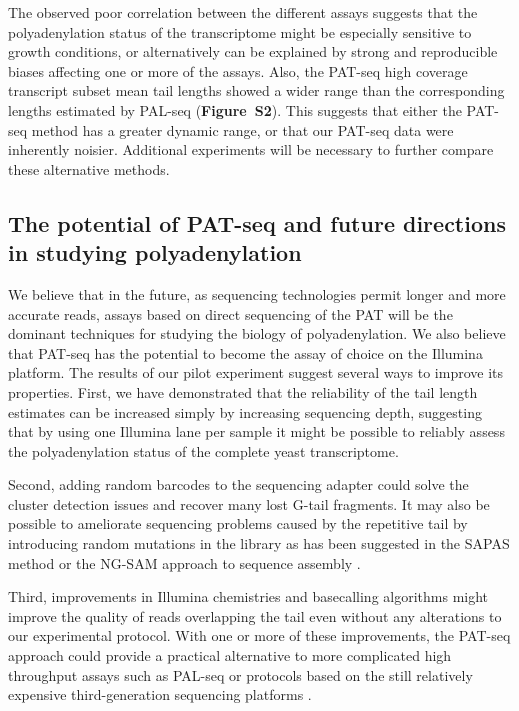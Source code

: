 \documentclass[10pt]{article}
\begin{document}
The observed poor correlation between the different assays suggests that the polyadenylation status of the transcriptome might be especially sensitive to growth conditions, or alternatively can be explained by strong and reproducible biases affecting one or more of the assays. Also, the PAT-seq high coverage transcript subset mean tail lengths showed a wider range than the corresponding lengths estimated by PAL-seq (\textbf{Figure~S2}).  This suggests that either the PAT-seq method has a greater dynamic range, or that our PAT-seq data were inherently noisier. Additional experiments will be necessary to further compare these alternative methods.

\subsection*{The potential of PAT-seq and future directions in studying polyadenylation}

We believe that in the future, as sequencing technologies permit longer and more accurate reads, assays based on direct sequencing of the PAT will be the dominant techniques for studying the biology of polyadenylation. We also believe that PAT-seq has the potential to become the assay of choice on the Illumina platform.  The results of our pilot experiment suggest several ways to improve its properties. First, we have demonstrated that the reliability of the tail length estimates can be increased simply by increasing sequencing depth, suggesting that by using one Illumina lane per sample it might be possible to reliably assess the polyadenylation status of the complete yeast transcriptome. 

Second, adding random barcodes to the sequencing adapter could solve the cluster detection issues and recover many lost G-tail fragments.  It may also be possible to ameliorate sequencing problems caused by the repetitive tail by introducing random mutations in the library as has been suggested in the SAPAS method \cite{fu11} or the NG-SAM approach to sequence assembly \cite{sipos12}.

Third, improvements in Illumina chemistries and basecalling algorithms might improve the quality of reads overlapping the tail even without any alterations to our experimental protocol. With one or more of these improvements, the PAT-seq approach could provide a practical alternative to more complicated high throughput assays such as PAL-seq or protocols based on the still relatively expensive third-generation sequencing platforms \cite{sharon13}.
\end{document}
